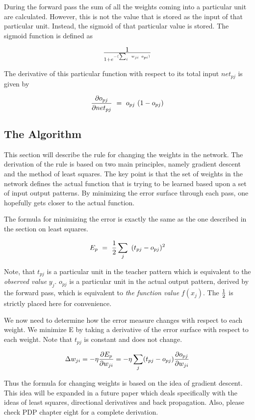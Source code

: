 	During the forward pass the sum of all the weights coming into
a particular unit are calculated.  However, this is not the value that
is stored as the input of that particular unit.  Instead, the sigmoid
of that particular value is stored.  The sigmoid function is defined as

	$$1 \over {1 + e^ {-(\sum_i \ w_{ji} \ o_{pi})}}$$

	The derivative of this particular function with respect to its
total input $net_{pj}$ is given by

	$${\partial o_{pj} \over \partial net_{pj}} \ = \ o_{pj} \ (1 - o_{pj})$$

\subsection{The Algorithm}

	This section will describe the rule for changing the weights
in the network.  The derivation of the rule is based on two main
principles, namely gradient descent and the method of least squares.
The key point is that the set of weights in the network defines the
actual function that is trying to be learned based upon a set of input
output patterns.  By minimizing the error surface through each pass,
one hopefully gets closer to the actual function.

	The formula for minimizing the error is exactly the same as
the one described in the section on least squares.  

	$$E_p \ = \ {1 \over 2} \sum_j \ {(t_{pj} - o_{pj}}) ^ 2$$

	Note, that $t_{pj}$ is a particular unit in the teacher
pattern which is equivalent to the {\it observed value} $y_j$.
$o_{pj}$ is a particular unit in the actual output pattern, derived by
the forward pass, which is equivalent to {\it the function value}
$f(x_j)$.  The $1 \over 2$ is strictly placed here for convenience.

	We now need to determine how the error measure changes with
respect to each weight.  We minimize E by taking a derivative of the
error surface with respect to each weight.  Note that $t_{pj}$ is
constant and does not change.
	
	$$\Delta w_{ji} = - \eta {\partial E_p \over \partial w_{ji}} =
- \eta \sum_j ({t_{pj} - o_{pj}}) {\partial o_{pj} \over \partial w_{ji}}$$


	Thus the formula for changing weights is based on the idea of
gradient descent.  This idea will be expanded in a future paper which
deals specifically with the ideas of least squares, directional
derivatives and back propagation.  Also, please check PDP chapter
eight for a complete derivation.


